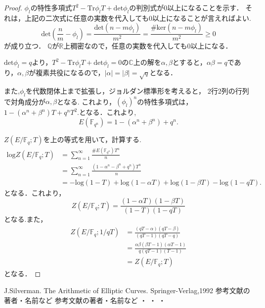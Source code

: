 \documentclass{ujarticle}
\begin{document}
\begin{proof}
 $\phi_l$の特性多項式$T^2 -\mathrm{Tr}\phi_l T+ \mathrm{det}\phi_l$の判別式が0以上になることを示す．
 それは，上記の二次式に任意の実数を代入しても0以上になることが言えればよい.
 \begin{equation*}
  \mathrm{det}(\frac{n}{m} - \phi_l)=\frac{\mathrm{det}(n -m \phi_l)}{m^2}
  = \frac{\#\mathrm{ker}(n -m \phi_l)}{m^2} \ge 0
 \end{equation*}
が成り立つ．
$\mathbb{Q}$が$\mathbb{R}$上稠密なので，任意の実数を代入しても0以上になる．

$\mathrm{det}\phi_l=q$より，$T^2 -\mathrm{Tr}\phi_l T+ \mathrm{det}\phi_l=0$の$\mathbb{C}$上の解を$\alpha,\beta$とすると，$\alpha \beta=q$であり，$\alpha,\beta$が複素共役になるので，$|\alpha|=|\beta|=\sqrt{q}$となる．

また,$\phi_l$を代数閉体上まで拡張し，ジョルダン標準形を考えると，
2行2列の行列で対角成分が$\alpha,\beta$となる.
これより，$(\phi_l)^n$の特性多項式は，$1-(\alpha^n + \beta^n)T +q^nT^2.$となる．これより,
\begin{equation*}
  E(\mathbb{F}_{q^n})=1-(\alpha^n + \beta^n) +q^n.
\end{equation*}

$Z(E/\mathbb{F}_q;T)$を上の等式を用いて，計算する.
\begin{align*}
  \mathrm{log}Z(E/\mathbb{F}_q;T) &= \sum_{n=1}^{\infty} \frac{\# E(\mathbb{F}_{q^n})T^n}{n} \\
  &= \sum_{n=1}^{\infty} \frac{(1 - \alpha^n -\beta^n + q^n)T^n}{n} \\
  &= -\mathrm{log}(1-T) + \mathrm{log}(1- \alpha T)+ \mathrm{log}(1- \beta T) - \mathrm{log}(1 -qT).
\end{align*}
となる．これより，
\begin{equation*}
 Z(E/\mathbb{F}_q;T)=\frac{(1- \alpha T)(1- \beta T)}{(1-T)(1-qT)}
\end{equation*}
となる.また，
\begin{align*}
  Z(E/\mathbb{F}_q;1/qT) &= \frac{(qT -\alpha)(qT -\beta)}{(q T - 1)(qT -q)} \\
  &= \frac{\alpha \beta(\beta T - 1)(\alpha T - 1)}{q(q T - 1)(T -1)}　\\
  &= Z(E/\mathbb{F}_q;T)
\end{align*}
となる．
\end{proof}

\begin{thebibliography}{数字}
 J.Silverman. The Arithmetic of Elliptic Curves. Springer-Verlag,1992
参考文献の著者・名前など
参考文献の著者・名前など
・
・
・
\end{thebibliography}
\end{document}
